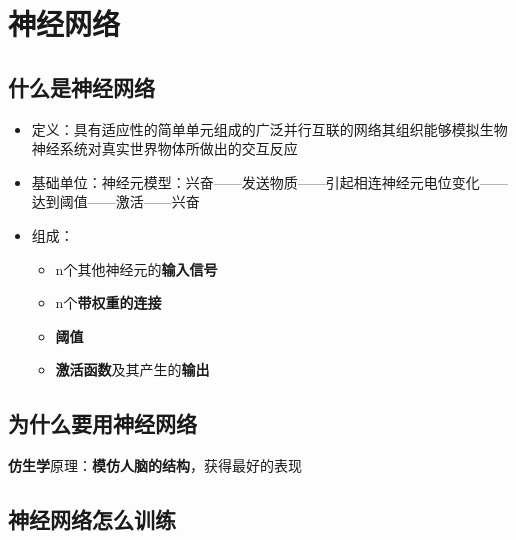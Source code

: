 \documentclass[UTF8]{ctexart}
\begin{document}
\newpage
\section{神经网络}
\subsection{什么是神经网络}
\begin{itemize}
	\item 定义：具有适应性的简单单元组成的广泛并行互联的网络其组织能够模拟生物神经系统对真实世界物体所做出的交互反应
	\item 基础单位：神经元模型：兴奋——发送物质——引起相连神经元电位变化——达到阈值——激活——兴奋
	\item 组成： \begin{itemize}
		\item n个其他神经元的{\bfseries 输入信号}
		\item n个{\bfseries 带权重的连接}
		\item {\bfseries 阈值}
		\item {\bfseries 激活函数}及其产生的{\bfseries 输出}
	\end{itemize}
\end{itemize}

\subsection{为什么要用神经网络}
{\bfseries 仿生学}原理：{\bfseries 模仿人脑的结构}，获得最好的表现

\subsection{神经网络怎么训练}
\end{document}
